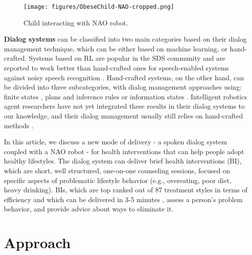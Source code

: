 \documentclass[letterpaper]{article}
\begin{document}
\begin{sloppy}
 \begin{figure}
 \centering
 \texttt{[image: figures/ObeseChild-NAO-cropped.png]}
 \caption{Child interacting with NAO robot.}
 \label{q-values}
 \end{figure}

{\bf Dialog systems} can be classified into two main categories based on their dialog management 
technique, which can be either based on machine learning, or hand-crafted.  Systems based on RL are 
popular in the SDS community and are reported to work better than hand-crafted ones for  
speech-enabled systems against noisy speech recognition \cite{young2013pomdp}. 
Hand-crafted systems, on the other hand, can be divided into three subcategories, with dialog 
management approaches using: finite states \cite{sutton1998CSLU}, plans and inference rules 
\cite{ferguson1998trips,Bohus2009} or information states \cite{Traum03}. Intelligent robotics agent 
researchers have not yet integrated these results in their dialog systems to our knowledge, and 
their dialog management usually still relies on 
hand-crafted methods \cite{morbiniFlores2012,Bickmore2010}. 

In this article, we discuss a new mode of delivery - a spoken dialog system coupled with a NAO robot 
- 
for health interventions that can help people adopt healthy lifestyles.  The dialog system can 
deliver brief health interventions (BI), which are short, well structured, one-on-one counseling 
sessions, focused on specific aspects of problematic lifestyle behavior (e.g., overeating, poor 
diet, 
heavy drinking). BIs, which are top ranked out of 87 treatment styles in terms of efficiency 
\cite{miller2002mesa} and which can be delivered in 3-5 minutes \cite{Moyer2002}, assess a person's 
problem behavior, and provide advice about ways to eliminate it. 


\section{Approach}


\end{sloppy}
\end{document}
